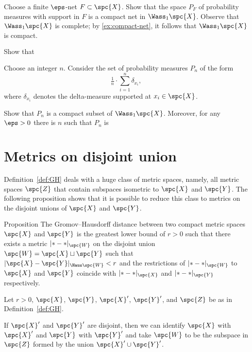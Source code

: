 Choose a finite $\eps$-net $F\subset\spc{X}$.
Show that the space $P_F$ of probability measures with support in $F$ is a compact net in $\Wass_1\spc{X}$.
Observe that $\Wass_1\spc{X}$ is complete; 
by \ref{ex:compact-net}, it follows that $\Wass_1\spc{X}$ is compact.

Show that 

Choose an integer $n$.
Consider the set of probability measures $P_n$ of the form 
\[\tfrac1n\cdot\sum_{i=1}^n\delta_{x_i},\]
where $\delta_{x_i}$ denotes the delta-measure supported at $x_i\in\spc{X}$. 

Show that $P_n$ is a compact subset of $\Wass_1\spc{X}$.
Moreover, for any $\eps>0$ there is $n$ such that $P_n$ is 





















\section{Metrics on disjoint union}

Definition~\ref{def:GH} deals with a huge class of metric spaces,
namely, all metric spaces $\spc{Z}$ that contain subspaces isometric to $\spc{X}$ and $\spc{Y}$.
The following proposition shows that it is possible to reduce this class to metrics on the disjoint unions of $\spc{X}$ and $\spc{Y}$. 

\begin{thm}{Proposition}\label{prop:GH=X+Y}
The Gromov--Hausdorff distance between two compact metric spaces $\spc{X}$
and $\spc{Y}$ is the greatest lower bound of $r>0$ such that there exists a metric
$|{*}-{*}|_{\spc{W}}$ on the disjoint union $\spc{W}=\spc{X}\sqcup \spc{Y}$ 
such that $|\spc{X}-\spc{Y}|_{\Haus\spc{W}} < r$
and 
the restrictions of $|{*}-{*}|_{\spc{W}}$ to $\spc{X}$ and $\spc{Y}$
coincide with $|{*}-{*}|_\spc{X}$ and $|{*}-{*}|_{\spc{Y}}$ 
respectively. 
\end{thm}

Let $r>0$, $\spc{X}$, $\spc{Y}$, $\spc{X}'$, $\spc{Y}'$, and $\spc{Z}$ be as in Definition~\ref{def:GH}.

If  $\spc{X}'$ and $\spc{Y}'$ are disjoint, then we can identify $\spc{X}$ with  $\spc{X}'$ and $\spc{Y}$ with $\spc{Y}'$ and take $\spc{W}$ to be the subspace in $\spc{Z}$ formed by the union $\spc{X}'\cup\spc{Y}'$.

